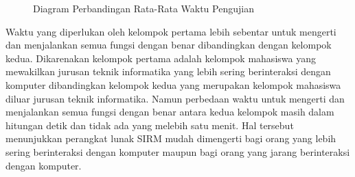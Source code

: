 \begin{figure}
\centering
{}
\caption[Diagram Perbandingan Rata-Rata Waktu Pengujian]{Diagram Perbandingan Rata-Rata Waktu Pengujian}
\label{fig:diagramperbandinganrataratawaktupengujian}
\end{figure}

Waktu yang diperlukan oleh kelompok pertama lebih sebentar untuk mengerti dan
menjalankan semua fungsi dengan benar dibandingkan dengan kelompok kedua.
Dikarenakan kelompok pertama adalah kelompok mahasiswa yang mewakilkan jurusan
teknik informatika yang lebih sering berinteraksi dengan komputer dibandingkan kelompok
kedua yang merupakan kelompok mahasiswa diluar jurusan teknik informatika. Namun
perbedaan waktu untuk mengerti dan menjalankan semua fungsi dengan benar antara kedua
kelompok masih dalam hitungan detik dan tidak ada yang melebih satu menit. Hal
tersebut menunjukkan perangkat lunak SIRM mudah dimengerti bagi orang yang lebih
sering berinteraksi dengan komputer maupun bagi orang yang jarang berinteraksi
dengan komputer.

